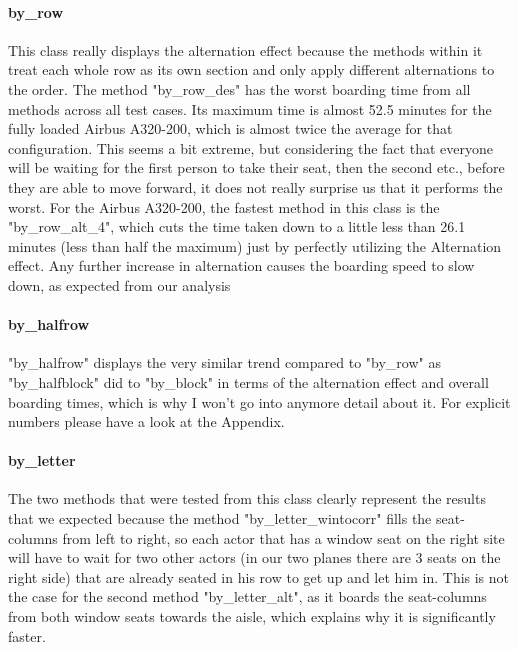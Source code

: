 \documentclass[11pt]{article}
\begin{document}
 \paragraph{by\_row}
 This class really displays the alternation effect because the methods within it treat each whole row as its own section and only apply different alternations to the order. The method "by\_row\_des" has the worst boarding time from all methods across all test cases. Its maximum time is almost 52.5 minutes for the fully loaded Airbus A320-200, which is almost twice the average for that configuration. This seems a bit extreme, but considering the fact that everyone will be waiting for the first person to take their seat, then the second etc., before they are able to move forward, it does not really surprise us that it performs the worst. For the Airbus A320-200, the fastest method in this class is the "by\_row\_alt\_4", which cuts the time taken down to a little less than 26.1 minutes (less than half the maximum) just by perfectly utilizing the Alternation effect. Any further increase in alternation causes the boarding speed to slow down, as expected from our analysis
 
 \paragraph{by\_halfrow}
 "by\_halfrow" displays the very similar trend compared to "by\_row" as "by\_halfblock" did to "by\_block" in terms of the alternation effect and overall boarding times, which is why I won't go into anymore detail about it. For explicit numbers please have a look at the Appendix. 
 
 \paragraph{by\_letter}
 The two methods that were tested from this class clearly represent the results that we expected because the method "by\_letter\_wintocorr" fills the seat-columns from left to right, so each actor that has a window seat on the right site will have to wait for two other actors (in our two planes there are 3 seats on the right side) that are already seated in his row to get up and let him in. This is not the case for the second method "by\_letter\_alt", as it boards the seat-columns from both window seats towards the aisle, which explains why it is significantly faster.
 
\end{document}
